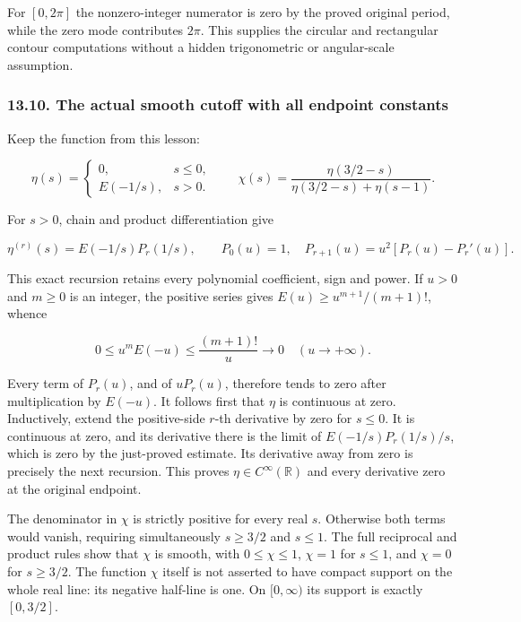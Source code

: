 \documentclass[
  11pt,
]{article}
\begin{document}
For \([0,2\pi]\) the nonzero-integer numerator is zero by the proved
original period, while the zero mode contributes \(2\pi\). This supplies
the circular and rectangular contour computations without a hidden
trigonometric or angular-scale assumption.

\subsubsection{13.10. The actual smooth cutoff with all endpoint
constants}\label{the-actual-smooth-cutoff-with-all-endpoint-constants}

Keep the function from this lesson:

\[
 \eta(s)=\begin{cases}0,&s\le0,\\ E(-1/s),&s>0.\end{cases}
 \qquad
 \chi(s)=\frac{\eta(3/2-s)}
               {\eta(3/2-s)+\eta(s-1)}.
\tag{OC38}
\]

For \(s>0\), chain and product differentiation give

\[
 \eta^{(r)}(s)=E(-1/s)P_r(1/s),\qquad
 P_0(u)=1,\quad
 P_{r+1}(u)=u^2[P_r(u)-P_r'(u)].
\tag{OC39}
\]

This exact recursion retains every polynomial coefficient, sign and
power. If \(u>0\) and \(m\ge0\) is an integer, the positive series gives
\(E(u)\ge u^{m+1}/(m+1)!\), whence

\[
 0\le u^mE(-u)
 \le\frac{(m+1)!}{u}\longrightarrow0
 \quad(u\longrightarrow+\infty).
\tag{OC40}
\]

Every term of \(P_r(u)\), and of \(uP_r(u)\), therefore tends to zero
after multiplication by \(E(-u)\). It follows first that \(\eta\) is
continuous at zero. Inductively, extend the positive-side \(r\)-th
derivative by zero for \(s\le0\). It is continuous at zero, and its
derivative there is the limit of \(E(-1/s)P_r(1/s)/s\), which is zero by
the just-proved estimate. Its derivative away from zero is precisely the
next recursion. This proves \(\eta\in C^\infty(\mathbb R)\) and every
derivative zero at the original endpoint.

The denominator in \(\chi\) is strictly positive for every real \(s\).
Otherwise both terms would vanish, requiring simultaneously \(s\ge3/2\)
and \(s\le1\). The full reciprocal and product rules show that \(\chi\)
is smooth, with \(0\le\chi\le1\), \(\chi=1\) for \(s\le1\), and
\(\chi=0\) for \(s\ge3/2\). The function \(\chi\) itself is not asserted
to have compact support on the whole real line: its negative half-line
is one. On \([0,\infty)\) its support is exactly \([0,3/2]\).
\end{document}
